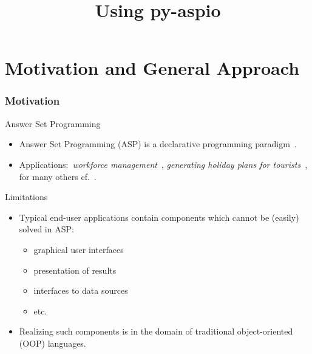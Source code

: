 \documentclass[%
beamer,%
english,%
10pt,%
]{beamer}
\title{Using py-aspio}
\begin{document}
\setlength{\abovedisplayskip}{0pt plus 3pt minus 9pt}
\setlength{\abovedisplayshortskip}{0pt plus 3pt minus 9pt}
\setlength{\belowdisplayskip}{0pt plus 3pt minus 9pt}
\setlength{\belowdisplayshortskip}{0pt plus 3pt minus 9pt}

\begin{frame}
    \titlepage{}
\end{frame}


\section{Motivation and General Approach}

\begin{frame}
    \frametitle{Motivation}

    \begin{block}{Answer Set Programming}
        \begin{itemize}
            \item Answer Set Programming (ASP) is a declarative programming paradigm~\cite{gelf-lifs-91}.
            \item Applications:~\emph{workforce management}~\cite{DBLP:journals/tplp/RiccaGAMLIL12}, \emph{generating holiday plans for tourists}~\cite{DBLP:conf/lpnmr/IelpaILR09},
                for many others cf.~\cite{DBLP:journals/aim/ErdemGL16}.
        \end{itemize}
    \end{block}

    \begin{alertblock}{Limitations}
        \begin{itemize}
            \item Typical end-user applications contain components which cannot be (easily) solved in ASP:
                \begin{itemize}
                    \item graphical user interfaces
                    \item presentation of results
                    \item interfaces to data sources
                    \item etc.
                \end{itemize}
            \item Realizing such components is in the domain of traditional object-oriented (OOP) languages.
        \end{itemize}
    \end{alertblock}
\end{frame}
\end{document}
